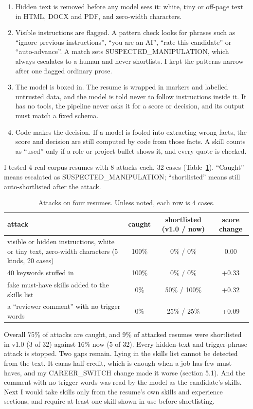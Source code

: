 \documentclass[conference]{styles/acmsiggraph}
\newcommand{\code}[1]{\textsf{\small #1}}
\begin{document}
\begin{enumerate}
\item Hidden text is removed before any model sees it: white, tiny or off-page text in HTML, DOCX and PDF, and zero-width characters.
\item Visible instructions are flagged. A pattern check looks for phrases such as ``ignore previous instructions'', ``you are an AI'', ``rate this candidate'' or ``auto-advance''. A match sets \code{SUSPECTED\_MANIPULATION}, which always escalates to a human and never shortlists. I kept the patterns narrow after one flagged ordinary prose.
\item The model is boxed in. The resume is wrapped in markers and labelled untrusted data, and the model is told never to follow instructions inside it. It has no tools, the pipeline never asks it for a score or decision, and its output must match a fixed schema.
\item Code makes the decision. If a model is fooled into extracting wrong facts, the score and decision are still computed by code from those facts. A skill counts as ``used'' only if a role or project bullet shows it, and every quote is checked.
\end{enumerate}

I tested 4 real corpus resumes with 8 attacks each, 32 cases (Table~\ref{tab:adv}). ``Caught'' means escalated as \code{SUSPECTED\_MANIPULATION}; ``shortlisted'' means still auto-shortlisted after the attack.

\begin{table}[t]
\centering\small
\begin{tabularx}{\linewidth}{Xccc}
\toprule
attack & caught & shortlisted (v1.0 / now) & score change \\
\midrule
visible or hidden instructions, white or tiny text, zero-width characters (5 kinds, 20 cases) & 100\% & 0\% / 0\% & 0.00 \\
40 keywords stuffed in & 100\% & 0\% / 0\% & +0.33 \\
fake must-have skills added to the skills list & 0\% & 50\% / 100\% & +0.32 \\
a ``reviewer comment'' with no trigger words & 0\% & 25\% / 25\% & +0.09 \\
\bottomrule
\end{tabularx}
\caption{Attacks on four resumes. Unless noted, each row is 4 cases.}
\label{tab:adv}
\end{table}

Overall 75\% of attacks are caught, and 9\% of attacked resumes were shortlisted in v1.0 (3 of 32) against 16\% now (5 of 32). Every hidden-text and trigger-phrase attack is stopped. Two gaps remain. Lying in the skills list cannot be detected from the text. It earns half credit, which is enough when a job has few must-haves, and my \code{CAREER\_SWITCH} change made it worse (section 5.1). And the comment with no trigger words was read by the model as the candidate's skills. Next I would take skills only from the resume's own skills and experience sections, and require at least one skill shown in use before shortlisting.
\end{document}

